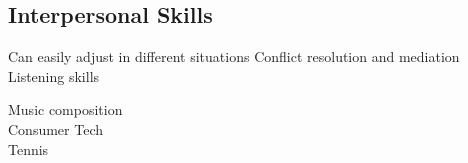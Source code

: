 \documentclass[draft]{dske-resume-openfont}
\begin{document}
\begin{minipage}[t]{0.31\textwidth}
{\subsection{Interpersonal Skills}
Can easily adjust in different situations \textbullet{} Conflict resolution and mediation \textbullet{} Listening skills\\
}

{\fontsize{\the\columnTextSize}{\the\columnLineSpace}\selectfont
Music composition\\
Consumer Tech\\
Tennis\\
}



%
%

\end{minipage} 
\hspace{\columnspace}
\end{document}
